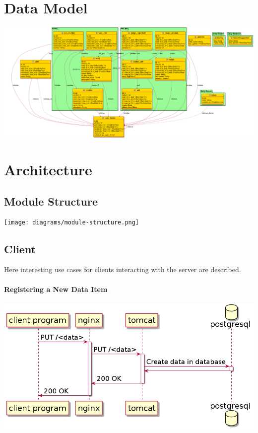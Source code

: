 \documentclass{memoir}
\begin{document}
\section{Data Model}

\includegraphics[width=1.25\linewidth]{diagrams/data-model.png}

\section{Architecture}

\subsection{Module Structure}

\texttt{[image: diagrams/module-structure.png]}

\subsection{Client}

Here interesting use cases for clients interacting with the server are described.

\paragraph{Registering a New Data Item\\}

\includegraphics[width=\linewidth]{diagrams/put-data.png}
\end{document}
